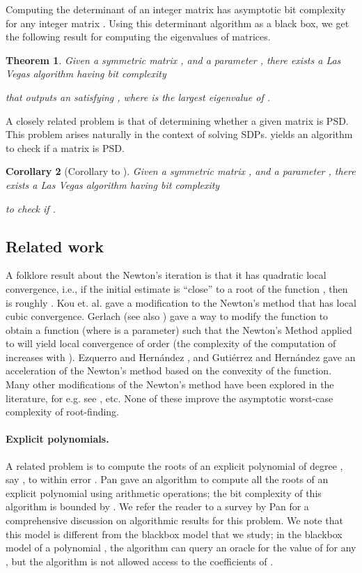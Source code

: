 \documentclass{article}[12pt]
\newtheorem{theorem}{Theorem}[section]
\newtheorem{corollary}[theorem]{Corollary}
\theoremstyle{definition}
\newcommand{\etal}{et. al.}
\begin{document}
Computing the determinant of an integer matrix has asymptotic bit complexity 
 for any integer matrix  \cite{s05}. 
Using this determinant algorithm as a black box,
we get the following result for computing the eigenvalues of matrices.
\begin{theorem}
\label{thm:main}
Given a symmetric matrix , and a
parameter , there exists a Las Vegas algorithm having bit complexity 
 
that outputs an  satisfying
,
where  is the largest eigenvalue of . 
\end{theorem}
A closely related problem is that of determining whether a given matrix is PSD. This 
problem arises naturally in the context of solving SDPs.  yields
an algorithm to check if a matrix is PSD.
\begin{corollary}[Corollary to ]
Given a symmetric matrix , and a
parameter , there exists a Las Vegas algorithm having bit complexity 
 
to check if .
\end{corollary}



\subsection{Related work}
A folklore result about the Newton's iteration is that it has quadratic local convergence, i.e.,
 if the initial estimate  is ``close'' to a root  of the function , 
then  is roughly .  
Kou \etal \cite{klw06} gave a modification to the Newton's method that has local cubic convergence.
Gerlach \cite{g94} (see also \cite{fp96,kkz97,kg00}) gave a way to modify the function  
to obtain a function  (where  is a parameter) such that 
the Newton's Method applied to  will yield local convergence of order 
(the complexity of the computation of  increases with ).
Ezquerro and Hern\'{a}ndez \cite{eh99}, and 
Guti{\'e}rrez and Hern\'{a}ndez \cite{gh01} gave an acceleration of the Newton's method 
based on the convexity of the function.
Many other modifications of the Newton's method have been explored in the literature,
for e.g. see \cite{ow08,lr08}, etc. None of these improve the asymptotic worst-case complexity of root-finding.


\paragraph{Explicit polynomials.} A related problem is to compute the roots of an explicit polynomial of degree , say , to within error .
Pan \cite{p96} gave an algorithm to compute all the roots of an explicit polynomial
using  arithmetic operations;
the bit complexity of this algorithm is bounded by .  
We refer the reader to a survey by Pan \cite{p97} for a comprehensive discussion on 
algorithmic results for this problem.
We note that this model is different from the blackbox model that we study;
in the blackbox model of a polynomial , the algorithm can query an oracle for the
value of  for any , but the algorithm is not allowed access to the coefficients of . 
\end{document}

